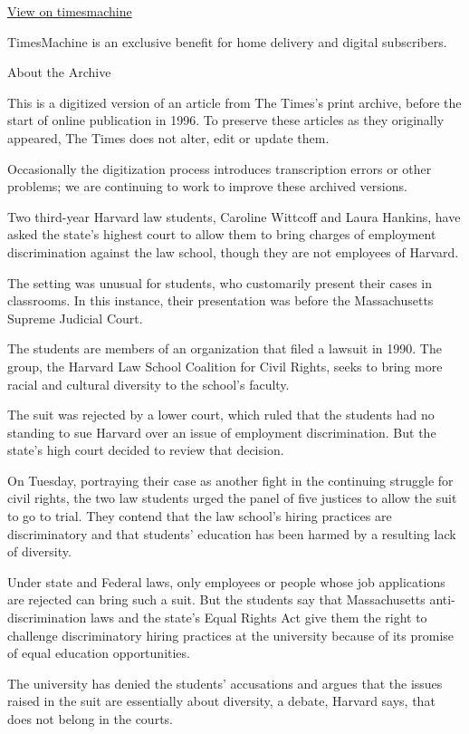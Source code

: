\href{http://timesmachine.nytimes3xbfgragh.onion/timesmachine/1992/03/06/004692.html}{View
on timesmachine}

TimesMachine is an exclusive benefit for home delivery and digital
subscribers.

About the Archive

This is a digitized version of an article from The Times's print
archive, before the start of online publication in 1996. To preserve
these articles as they originally appeared, The Times does not alter,
edit or update them.

Occasionally the digitization process introduces transcription errors or
other problems; we are continuing to work to improve these archived
versions.

Two third-year Harvard law students, Caroline Wittcoff and Laura
Hankins, have asked the state's highest court to allow them to bring
charges of employment discrimination against the law school, though they
are not employees of Harvard.

The setting was unusual for students, who customarily present their
cases in classrooms. In this instance, their presentation was before the
Massachusetts Supreme Judicial Court.

The students are members of an organization that filed a lawsuit in
1990. The group, the Harvard Law School Coalition for Civil Rights,
seeks to bring more racial and cultural diversity to the school's
faculty.

The suit was rejected by a lower court, which ruled that the students
had no standing to sue Harvard over an issue of employment
discrimination. But the state's high court decided to review that
decision.

On Tuesday, portraying their case as another fight in the continuing
struggle for civil rights, the two law students urged the panel of five
justices to allow the suit to go to trial. They contend that the law
school's hiring practices are discriminatory and that students'
education has been harmed by a resulting lack of diversity.

Under state and Federal laws, only employees or people whose job
applications are rejected can bring such a suit. But the students say
that Massachusetts anti-discrimination laws and the state's Equal Rights
Act give them the right to challenge discriminatory hiring practices at
the university because of its promise of equal education opportunities.

The university has denied the students' accusations and argues that the
issues raised in the suit are essentially about diversity, a debate,
Harvard says, that does not belong in the courts.


